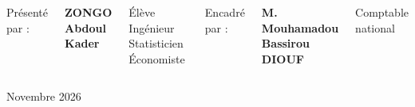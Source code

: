 \documentclass[aspectratio=169,11pt]{beamer}
\begin{document}
\begin{frame}[plain]
  \begin{columns}[T,onlytextwidth]
      \centering
      {\scriptsize\color{marine}Présenté par :\par}
      {\footnotesize\bfseries\color{marine}ZONGO Abdoul Kader\par}
      {\scriptsize Élève Ingénieur Statisticien Économiste}
      \centering
      {\scriptsize\color{marine}Encadré par :\par}
      {\footnotesize\bfseries\color{marine}M. Mouhamadou Bassirou DIOUF\par}
      {\scriptsize Comptable national}
  \end{columns}
  \vspace{-0.12cm}
  \begin{center}
    {\scriptsize\color{marine}Novembre 2026}
  \end{center}
\end{frame}
\end{document}
